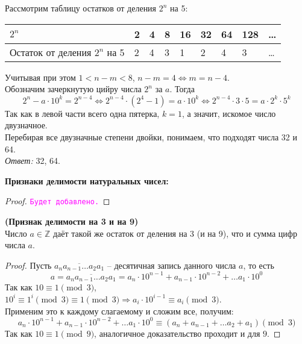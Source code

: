 \documentclass[11pt]{article}
\begin{document}
Рассмотрим таблицу остатков от деления $2^n$ на 5:

\begin{center}
\begin{tabular}{ | l | l | l | l | l | l | l | l | l |}
\hline
$2^n$ & 2 & 4 & 8 & 16 & 32 & 64 & 128 & \ldots \\ \hline
Остаток от деления $2^n$ на 5   & 2 & 4 & 3 & 1 & 2 & 4 & 3 & \ldots\\\hline
\end{tabular}
\end{center}

Учитывая при этом $1 < n - m < 8 $, $n - m = 4 \Leftrightarrow m = n - 4$.\\
Обозначим зачеркнутую цийру числа $2^n$ за $a$. Тогда
\[2^n - a \cdot 10^k = 2^{n - 4} \Leftrightarrow
2^{n - 4} \cdot (2^{4} - 1) = a \cdot 10^k \Leftrightarrow
2^{n - 4} \cdot 3 \cdot 5 = a \cdot 2^k \cdot 5^k \]
Так как в левой части всего одна пятерка, $k = 1$, а значит, искомое число двузначное.\\
Перебирая все двузначные степени двойки, понимаем, что подходят числа 32 и 64.\\
\textit{Ответ:} 32, 64.

\textbf{Признаки делимости натуральных чисел:}

\begin{proof}
    \textcolor{magenta}{\texttt{Будет добавлено.}}
\end{proof}

\begin{theorem}\textbf{(Признак делимости на 3 и на 9)}\\
	Число $a \in \mathbb{Z}$ даёт такой же остаток от деления на 3 (и на 9), что и сумма цифр числа $a$.
\end{theorem}

\begin{proof}

	Пусть $\overline{a_na_{n - 1}\ldots a_2 a_1}$ -- десятичная запись данного числа $a$, то есть
	\[a = \overline{a_na_{n - 1}\ldots a_2 a_1} = a_n \cdot 10^{n - 1} + a_{n - 1}\cdot 10^{n - 2} + \ldots a_1 \cdot 10^0 \]
	Так как $10 \equiv 1 \pmod 3$, $10^{i} \equiv 1^{i} \pmod 3 \equiv 1 \pmod 3 \Rightarrow a_i \cdot 10^{i - 1} \equiv a_i \pmod 3$.  \\
	Применим это к каждому слагаемому и сложим все, получим:\\
	\[a_n \cdot 10^{n - 1} + a_{n - 1}\cdot 10^{n - 2} + \ldots a_1 \cdot 10^0 \equiv (a_n + a_{n - 1} + \ldots  a_2 + a_1) \pmod 3\]
	Так как $10 \equiv 1 \pmod{9}$, аналогичное доказательство проходит и для $9$.

\end{proof}
\end{document}
